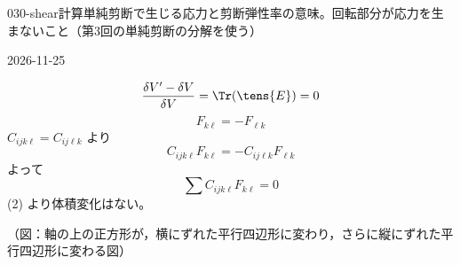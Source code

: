 \documentclass[uplatex,dvipdfmx,a4paper,11pt]{jsarticle}
\begin{document}
\begin{mondai}{030-shear}{計算}{単純剪断で生じる応力と剪断弾性率の意味。回転部分が応力を生まないこと（第3回の単純剪断の分解を使う）}
\begin{kotaeutsushi}{2026-11-25}
\begin{align*}
\end{align*}
\[ \frac{\delta V'-\delta V}{\delta V}=\Tr(\tens{E})=0 \]
\[ F_{k\ell}=-F_{\ell k} \]
$C_{ijk\ell}=C_{ij\ell k}$ より
\[ C_{ijk\ell}F_{k\ell}=-C_{ij\ell k}F_{\ell k} \]
よって
\[ \sum C_{ijk\ell}F_{k\ell}=0 \]
(2) より体積変化はない。

（図：軸の上の正方形が，横にずれた平行四辺形に変わり，さらに縦にずれた平行四辺形に変わる図）


\end{kotaeutsushi}
\end{mondai}
\end{document}
